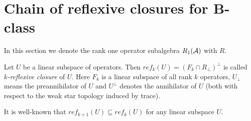 \documentclass[12pt]{amsart}
\theoremstyle{case}
\begin{document}


\section{Chain of reflexive closures for B-class}
  In this section we denote the rank one operator subalgebra $R_1(\cal{A})$ with $R$.
  \begin{definition}
    Let $U$ be a linear subspace of operators.
    Then $ref_k(U) = (F_k \cap R_\perp)^{\perp}$ is called \emph{$k$-reflexive closure} of $U$.
    Here $F_k$ is a linear subspace of all rank $k$ operators, $U_\perp$ means the preannihilator of $U$ and
      $U^\perp$ denotes the annihilator of $U$ (both with respect to the weak star topology induced by trace).
  \end{definition}
  It is well-known that $ref_{k + 1}(U) \subseteq ref_k(U)$ for any linear subspace $U$.
\end{document}
